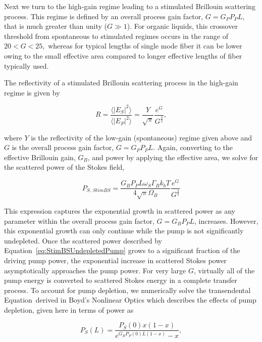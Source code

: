 Next we turn to the high-gain regime leading to a stimulated Brillouin scattering process. This regime is defined by an overall process gain factor, $G = G_{P}P_{P}L$, that is much greater than unity ($G \gg 1$). For organic liquids, this crossover threshold from spontaneous to stimulated regimes occurs in the range of $20 < G < 25,$\cite{boyd1990noise} whereas for typical lengths of single mode fiber it can be lower\cite{ippen1972stimulated} owing to the small effective area compared to longer effective lengths of fiber typically used.

The reflectivity of a stimulated Brillouin scattering process in the high-gain regime is given by \cite{boyd1990noise}

\begin{equation}
  R = \frac{\langle|E_{S}|^{2}\rangle}{\langle|E_{P}|^{2}\rangle} = \frac{Y}{\sqrt{\pi}}\frac{e^{G}}{G^{\frac{3}{2}}},
\end{equation}

where $Y$ is the reflectivity of the low-gain (spontaneous) regime given above and $G$ is the overall process gain factor, $G = G_{P}P_{P}L$. Again, converting to the effective Brillouin gain, $G_{B}$, and power by applying the effective area, we solve for the scattered power of the Stokes field,

\begin{equation}
  P_{S, \,\textit{StimBS}} = \frac{G_{B}P_{P}L\omega_{S}\Gamma_{B}k_{b}T}{4\sqrt{\pi}\Omega_{B}}\frac{e^{G}}{G^{\frac{3}{2}}}
  \label{eq:StimBSUndepletedPump}
\end{equation}

This expression captures the exponential growth in scattered power as any parameter within the overall process gain factor, $G = G_{B}P_{P}L$, increases. However, this exponential growth can only continue while the pump is not significantly undepleted. Once the scattered power described by Equation~\ref{eq:StimBSUndepletedPump} grows to a significant fraction of the driving pump power, the exponential increase in scattered Stokes power asymptotically approaches the pump power. For very large $G$, virtually all of the pump energy is converted to scattered Stokes energy in a complete transfer process.\cite{boyd2020nonlinear} To account for pump depletion, we numerically solve the transendental Equation~derived in Boyd's Nonlinear Optics which describes the effects of pump depletion, given here in terms of power as

\begin{equation}
  P_S(L) = \frac{P_S(0)x(1 - x)}{e^{G_{B}P_{P}(0)L(1 - x)} - x},
\end{equation}

